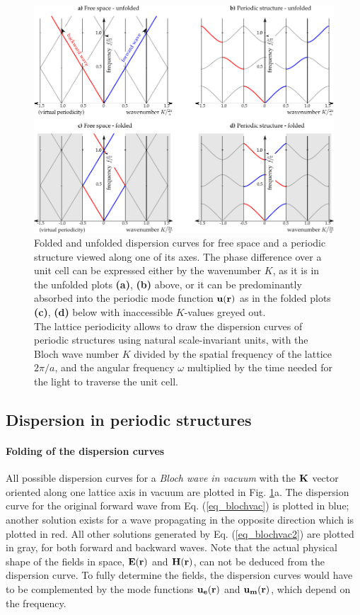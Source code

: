 \begin{figure}[ht] \caption{Folded and unfolded dispersion curves for free space and a periodic structure viewed along one of its axes. The phase difference over a unit cell can be expressed either by the wavenumber $K$, as it is in the unfolded plots \textbf{(a)}, \textbf{(b)} above, or it can be predominantly absorbed into the periodic mode function $\mathbf{u}({\mathbf{r}})$  as in the folded plots \textbf{(c)}, \textbf{(d)} below with inaccessible $K$-values greyed out. \\
The lattice periodicity allows to draw the dispersion curves of periodic structures using natural scale-invariant units, with the Bloch wave number $K$ divided by the spatial frequency of the lattice $2\pi/a$, and the angular frequency $\omega$ multiplied by the time needed for the light to traverse the unit cell.
} \label{fg_phcfolding} \centering 
	\includegraphics[width=\textwidth]{img/PhC_folding_illustration.pdf} 
\end{figure}
\clearpage


\subsection{Dispersion in periodic structures}
\paragraph{Folding of the dispersion curves} %
All possible dispersion curves for a \textit{Bloch wave in vacuum} with the ${\mathbf{K}}$ vector oriented along one lattice axis in vacuum are plotted in Fig. \ref{fg_phcfolding}a. The dispersion curve for the original forward wave from Eq. (\ref{eq_blochvac}) is plotted in blue; another solution exists for a wave propagating in the opposite direction which is plotted in red. All other solutions generated by Eq. (\ref{eq_blochvac2}) are plotted in gray, for both forward and backward waves. 
Note that the actual physical shape of the fields in space,  $\mathbf{E}({\mathbf{r}})$ and $\mathbf{H}({\mathbf{r}})$, can not be deduced from the dispersion curve. To fully determine the fields, the dispersion curves would have to be complemented by the mode functions $\mathbf{u_e}({\mathbf{r}})$ and $\mathbf{u_m}({\mathbf{r}})$, which depend on the frequency. 


